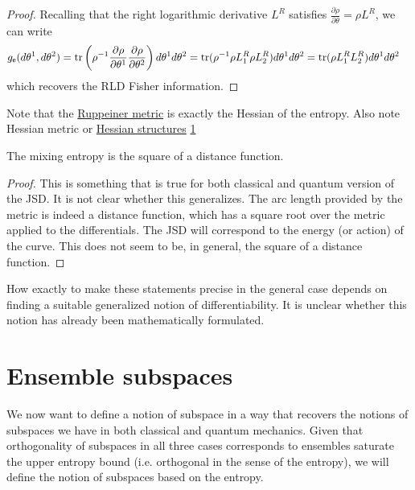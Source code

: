 \begin{proof}
Recalling that the right logarithmic derivative $L^R$ satisfies $\frac{\partial \rho}{\partial \theta} = \rho L^R$, we can write 
	\begin{equation}
	\begin{aligned}
	g_{\mathsf{e}}(d\theta^1, d\theta^2) &= \operatorname{tr}\left( \rho^{-1} \frac{\partial \rho}{\partial \theta^1 }\frac{\partial \rho}{\partial \theta^2}\right) d\theta^1 d\theta^2 = \operatorname{tr}(\rho^{-1}\rho L^R
	_1 \rho L^R_2)d\theta^1 d\theta^2 = \operatorname{tr}(\rho L^R
	_1 L^R_2)d\theta^1 d\theta^2
\end{aligned}
	\end{equation}
which recovers the RLD Fisher information.
\end{proof}

\begin{remark}
	Note that the \href{https://en.wikipedia.org/wiki/Ruppeiner_geometry}{Ruppeiner metric} is exactly the Hessian of the entropy. Also note Hessian metric or \href{https://web.osu.cz/~Zusmanovich/seminar/2017/wolak/ostrava-11-17-hessian-pdf.pdf}{Hessian structures} \href{https://link.springer.com/chapter/10.1007/978-3-642-40020-9_4}{1}
\end{remark}

\begin{conj}
	The mixing entropy is the square of a distance function.
\end{conj}

\begin{proof}
	This is something that is true for both classical and quantum version of the JSD. It is not clear whether this generalizes. The arc length provided by the metric is indeed a distance function, which has a square root over the metric applied to the differentials. The JSD will correspond to the energy (or action) of the curve. This does not seem to be, in general, the square of a distance function.
\end{proof}

\begin{remark}
	How exactly to make these statements precise in the general case depends on finding a suitable generalized notion of differentiability. It is unclear whether this notion has already been mathematically formulated.
\end{remark}

\section{Ensemble subspaces}

We now want to define a notion of subspace in a way that recovers the notions of subspaces we have in both classical and quantum mechanics. Given that orthogonality of subspaces in all three cases corresponds to ensembles saturate the upper entropy bound (i.e. orthogonal in the sense of the entropy), we will define the notion of subspaces based on the entropy.


